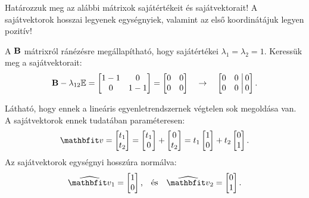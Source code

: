\documentclass[exercise]{math-standalone}
\begin{document}
\begin{exercise}{%
    Határozzuk meg az alábbi mátrixok sajátértékeit és sajátvektorait!
    A sajátvektorok hosszai legyenek egységnyiek, valamint az első koordinátájuk
    legyen pozitív!
  }
{  A $\mathbf{B}$ mátrixról ránézésre megállapítható, hogy sajátértékei $\lambda_1
    = \lambda_2 = 1$. Keressük meg a sajátvektorait:
  \[
    \mathbf{B} - \lambda_{12} {\mathbb{E}} = \begin{bmatrix}
      1 - 1 & 0     \\
      0     & 1 - 1
    \end{bmatrix} = \begin{bmatrix}
      0 & 0 \\
      0 & 0
    \end{bmatrix}
    \quad \rightarrow \quad
    \left[\begin{matrix}
        0 & 0 \\
        0 & 0
      \end{matrix}\right.\left|\begin{matrix}
        \,0 \\ \,0
      \end{matrix}\right]
    \text.
  \]

  Látható, hogy ennek a lineáris egyenletrendszernek végtelen sok megoldása van.
  A sajátvektorok ennek tudatában paraméteresen:
  \[
    \rvec v = \begin{bmatrix}
      t_1 \\ t_2
    \end{bmatrix} = \begin{bmatrix}
      t_1 \\ 0
    \end{bmatrix} + \begin{bmatrix}
      0 \\ t_2
    \end{bmatrix} = t_1 \begin{bmatrix}
      1 \\ 0
    \end{bmatrix} + t_2 \begin{bmatrix}
      0 \\ 1
    \end{bmatrix}
    \text{.}
  \]
  Az sajátvektorok egységnyi hosszúra normálva:
  \[
    \uvec v_1 = \begin{bmatrix}
      1 \\ 0
    \end{bmatrix}
    \text{,}
    \quad \text{és} \quad
    \uvec v_2 = \begin{bmatrix}
      0 \\ 1
    \end{bmatrix}
    \text{.}
  \]

  \tcbline

}
\end{exercise}
\end{document}
